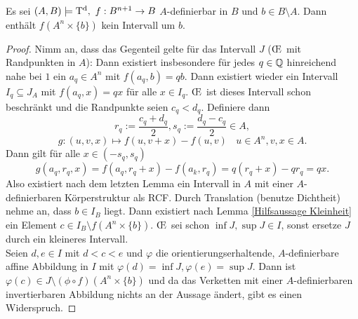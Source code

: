 \begin{lemma}
	Es sei $(A,B)\models\td,\ f:B^{n+1}\rightarrow B$ $A$-definierbar in $B$ und $b\in B\setminus A$. Dann enthält $f(A^n\times\{b\})$ kein Intervall um $b$.
\end{lemma}
\begin{proof}
	Nimm an, dass das Gegenteil gelte für das Intervall $J$ (\OE\ mit Randpunkten in $A$): Dann existiert insbesondere für jedes $q\in\mathbb{Q}$ hinreichend nahe bei $1$ ein $a_q\in A^n$ mit $f(a_q,b)=qb$. Dann existiert wieder ein Intervall $I_q\subseteq J_A$ mit $f(a_q,x)=qx$ für alle $x\in I_q$. \OE\ ist dieses Intervall schon beschränkt und die Randpunkte seien $c_q<d_q$. Definiere dann $$r_q:=\frac{c_q+d_q}{2},s_q:=\frac{d_q-c_q}{2}\in A,$$ $$g:(u,v,x)\mapsto f(u,v+x)-f(u,v)\ \ \ \ u\in A^n,v,x\in A.$$
	Dann gilt für alle $x\in(-s_q,s_q)$ $$g(a_q,r_q,x)=f(a_q,r_q+x)-f(a_k,r_q)=q(r_q+x)-qr_q=qx.$$
	Also existiert nach dem letzten Lemma ein Intervall in $A$ mit einer $A$-definierbaren Körperstruktur als RCF. Durch Translation (benutze Dichtheit) nehme an, dass $b\in I_B$ liegt. Dann existiert nach Lemma \ref{Hilfsaussage Kleinheit} ein Element $c\in I_B\setminus f(A^n\times\{b\})$. \OE\ sei schon $\inf J,\sup J\in I$, sonst ersetze $J$ durch ein kleineres Intervall.\\
	Seien $d,e\in I$ mit $d<c<e$ und $\varphi$ die orientierungserhaltende, $A$-definierbare affine Abbildung in $I$ mit $\varphi(d)=\inf J,\varphi(e)=\sup J$. Dann ist $\varphi(c)\in J\setminus(\phi\circ f)(A^n\times\{b\})$ und da das Verketten mit einer $A$-definierbaren invertierbaren Abbildung nichts an der Aussage ändert, gibt es einen Widerspruch.
\end{proof}

